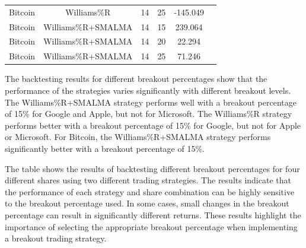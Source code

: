 \begin{table}[h!]
\begin{tabular}{|c|c|c|c|c|c|}
Bitcoin & Williams\%R & 14 & 25 & -145.049 \\

Bitcoin & Williams\%R+SMALMA & 14 & 15 & 239.064 \\
Bitcoin & Williams\%R+SMALMA & 14 & 20 & 22.294 \\

Bitcoin & Williams\%R+SMALMA & 14 & 25 & 71.246 \\





\hline
\end{tabular}
\end{table}

The backtesting results for different breakout percentages show that the performance of the strategies varies significantly with different breakout levels. The Williams\%R+SMALMA strategy performs well with a breakout percentage of 15\% for Google and Apple, but not for Microsoft. The Williams\%R strategy performs better with a breakout percentage of 15\% for Google, but not for Apple or Microsoft. For Bitcoin, the Williams\%R+SMALMA strategy performs significantly better with a breakout percentage of 15\%. 

The table shows the results of backtesting different breakout percentages for four different shares using two different trading strategies. The results indicate that the performance of each strategy and share combination can be highly sensitive to the breakout percentage used. In some cases, small changes in the breakout percentage can result in significantly different returns. These results highlight the importance of selecting the appropriate breakout percentage when implementing a breakout trading strategy. 





